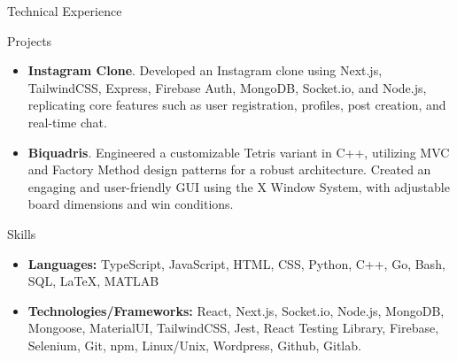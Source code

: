 \documentclass[]{mcdowellcv}
\begin{document}
	\begin{cvsection}{Technical Experience}
		\begin{cvsubsection}{Projects}{}{}
			\begin{itemize}
				\item \textbf{Instagram Clone}. Developed an Instagram clone using Next.js, TailwindCSS, Express, Firebase Auth, MongoDB, Socket.io, and Node.js, replicating core features such as user registration, profiles, post creation, and real-time chat.
				\item \textbf{Biquadris}. Engineered a customizable Tetris variant in C++, utilizing MVC and Factory Method design patterns for a robust architecture. Created an engaging and user-friendly GUI using the X Window System, with adjustable board dimensions and win conditions.
			\end{itemize}
		\end{cvsubsection}
	\end{cvsection}
	
	
	\begin{cvsection}{Skills}
		\begin{cvsubsection}{}{}{}	
			\begin{itemize}
				\item \textbf{Languages:} TypeScript, JavaScript, HTML, CSS, Python, C++, Go, Bash, SQL, LaTeX, MATLAB
				\item \textbf{Technologies/Frameworks:} React, Next.js, Socket.io, Node.js, MongoDB, Mongoose, MaterialUI, TailwindCSS, Jest, React Testing Library, Firebase, Selenium, Git, npm, Linux/Unix, Wordpress, Github, Gitlab.
			\end{itemize}
		\end{cvsubsection}
	\end{cvsection}
	
\end{document}
